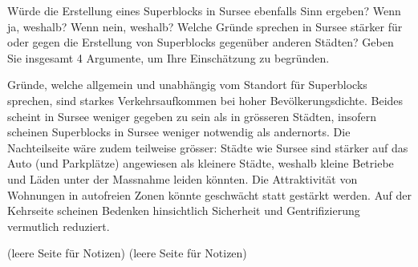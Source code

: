 \begin{questions}
	
	\droptotalpoints
	\clearpage
	\question[4] Würde die Erstellung eines Superblocks in Sursee ebenfalls Sinn ergeben? Wenn ja, weshalb? Wenn nein, weshalb? Welche Gründe sprechen in Sursee stärker für oder gegen die Erstellung von Superblocks gegenüber anderen Städten? Geben Sie insgesamt 4 Argumente, um Ihre Einschätzung zu begründen.
	
	\begin{solution}
	Gründe, welche allgemein und unabhängig vom Standort für Superblocks sprechen, sind starkes Verkehrsaufkommen bei hoher Bevölkerungsdichte. Beides scheint in Sursee weniger gegeben zu sein als in grösseren Städten, insofern scheinen Superblocks in Sursee weniger notwendig als andernorts. Die Nachteilseite wäre zudem teilweise grösser: Städte wie Sursee sind stärker auf das Auto (und Parkplätze) angewiesen als kleinere Städte, weshalb kleine Betriebe und Läden unter der Massnahme leiden könnten. Die Attraktivität von Wohnungen in autofreien Zonen könnte geschwächt statt gestärkt werden. Auf der Kehrseite scheinen Bedenken hinsichtlich Sicherheit und Gentrifizierung vermutlich reduziert.
	\end{solution}
	\fillwithlines{4cm}
	\droptotalpoints
\end{questions}

\clearpage
(leere Seite für Notizen)
\clearpage
(leere Seite für Notizen)
